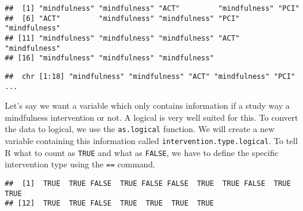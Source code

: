 \documentclass[]{book}
\newenvironment{Shaded}{\begin{snugshade}}{\end{snugshade}}
\newcommand{\KeywordTok}[1]{\textcolor[rgb]{0.13,0.29,0.53}{\textbf{#1}}}
\newcommand{\DataTypeTok}[1]{\textcolor[rgb]{0.13,0.29,0.53}{#1}}
\newcommand{\StringTok}[1]{\textcolor[rgb]{0.31,0.60,0.02}{#1}}
\newcommand{\OperatorTok}[1]{\textcolor[rgb]{0.81,0.36,0.00}{\textbf{#1}}}
\newcommand{\NormalTok}[1]{#1}
\theoremstyle{definition}
\theoremstyle{definition}
\theoremstyle{definition}
\theoremstyle{remark}
\begin{document}
\begin{Shaded}
\end{Shaded}

\begin{verbatim}
##  [1] "mindfulness" "mindfulness" "ACT"         "mindfulness" "PCI"        
##  [6] "ACT"         "mindfulness" "mindfulness" "PCI"         "mindfulness"
## [11] "mindfulness" "mindfulness" "mindfulness" "ACT"         "mindfulness"
## [16] "mindfulness" "mindfulness" "mindfulness"
\end{verbatim}

\begin{Shaded}
\end{Shaded}

\begin{verbatim}
##  chr [1:18] "mindfulness" "mindfulness" "ACT" "mindfulness" "PCI" ...
\end{verbatim}

Let's say we want a variable which only contains information if a study
way a mindfulness intervention or not. A logical is very well suited for
this. To convert the data to logical, we use the \texttt{as.logical}
function. We will create a new variable containing this information
called \texttt{intervention.type.logical}. To tell R what to count as
\texttt{TRUE} and what as \texttt{FALSE}, we have to define the specific
intervention type using the \texttt{==} command.

\begin{Shaded}
\end{Shaded}

\begin{verbatim}
##  [1]  TRUE  TRUE FALSE  TRUE FALSE FALSE  TRUE  TRUE FALSE  TRUE  TRUE
## [12]  TRUE  TRUE FALSE  TRUE  TRUE  TRUE  TRUE
\end{verbatim}
\end{document}
